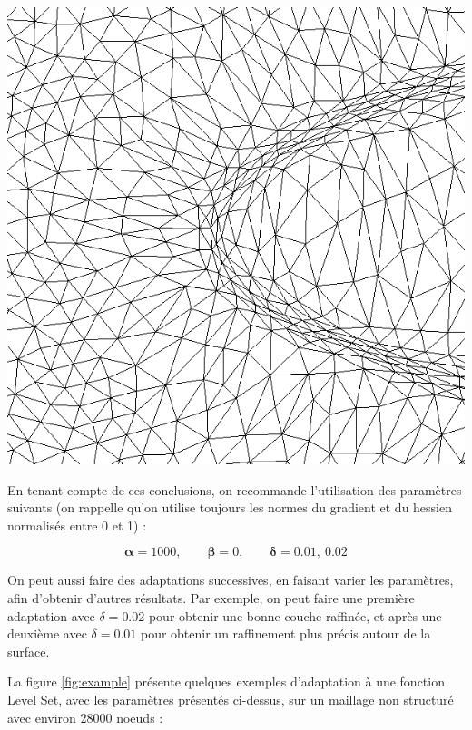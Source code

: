 \begingroup
	\centering
	\includegraphics[scale=.25]{Bordeaux/figures/anisoNormal.png}
\endgroup

\indent

\indent En tenant compte de ces conclusions, on recommande l'utilisation des paramètres suivants (on rappelle qu'on utilise toujours les normes du gradient et du hessien normalisés entre 0 et 1) : 

\begin{equation*}
	\boldsymbol{\alpha} = 1000, \qquad 
	\boldsymbol{\beta} = 0, \qquad
	\boldsymbol{\delta} = 0.01,\  0.02
\end{equation*}

\indent On peut aussi faire des adaptations successives, en faisant varier les paramètres, afin d'obtenir d'autres résultats. Par exemple, on peut faire une première adaptation avec \(\delta = 0.02\) pour obtenir une bonne couche raffinée, et après une deuxième avec \(\delta = 0.01\) pour obtenir un raffinement plus précis autour de la surface. 

\indent La figure \ref{fig:example} présente quelques exemples d'adaptation à une fonction Level Set, avec les paramètres présentés ci-dessus, sur un maillage non structuré avec environ 28000 noeuds : 

